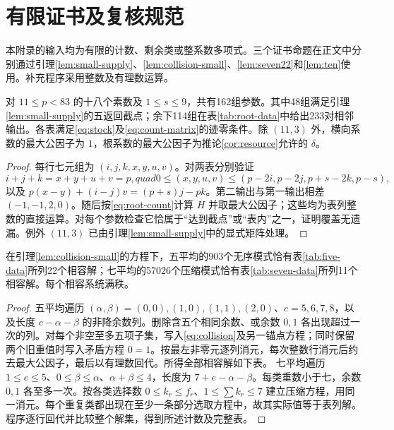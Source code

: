 \section{有限证书及复核规范}\label{app:certificates}
本附录的输入均为有限的计数、剩余类或整系数多项式。三个证书命题在正文中分别通过引理\ref{lem:small-supply}、\ref{lem:collision-small}、\ref{lem:seven22}和\ref{lem:ten}使用。补充程序采用整数及有理数运算。

\begin{proposition}[根计数证书]\label{prop:root-certificate}
对 $11\le p<83$ 的十八个素数及 $1\le s\le9$，共有162组参数。其中48组满足引理\ref{lem:small-supply}的五返回截点；余下114组在表\ref{tab:root-data}中给出233对相邻输出。各表满足\eqref{eq:stock}及\eqref{eq:count-matrix}的迹零条件。除 $(11,3)$ 外，横向系数的最大公因子为 $1$，根系数的最大公因子为推论\ref{cor:resource}允许的 $\delta$。
\end{proposition}
\begin{proof}
每行七元组为 $(i,j,k,x,y,u,v)$。对两表分别验证
\[
i+j+k=x+y+u+v=p,quad
0\le(x,y,u,v)\le(p-2i,p-2j,p+s-2k,p-s),
\]
以及 $p(x-y)+(i-j)v=(p+s)j-pk$。第二输出与第一输出相差 $(-1,-1,2,0)$。随后按\eqref{eq:root-count}计算 $H$ 并取最大公因子；这些均为表列整数的直接运算。对每个参数检查它恰属于“达到截点”或“表内”之一，证明覆盖无遗漏。例外 $(11,3)$ 已由引理\ref{lem:small-supply}中的显式矩阵处理。
\end{proof}


\begin{proposition}[碰撞分类证书]\label{prop:collision-certificate}
在引理\ref{lem:collision-small}的方程下，五平均的903个无序模式恰有表\ref{tab:five-data}所列22个相容解；七平均的57026个压缩模式恰有表\ref{tab:seven-data}所列11个相容解。每个相容系统满秩。
\end{proposition}
\begin{proof}
五平均遍历 $(\alpha,\beta)=(0,0),(1,0),(1,1),(2,0)$、$c=5,6,7,8$，以及长度 $c-\alpha-\beta$ 的非降余数列。删除含五个相同余数、或余数 $0,1$ 各出现超过一次的列。对每个非空至多五项子集，写入\eqref{eq:collision}及另一锚点方程；同时保留两个旧重值时写入矛盾方程 $0=1$。按最左非零元逐列消元，每次整数行消元后约去最大公因子，最后以有理数回代。所得全部相容解如下表。
七平均遍历 $1\le e\le5$、$0\le\beta\le\alpha$、$\alpha+\beta\le4$，长度为 $7+e-\alpha-\beta$。每类重数小于七，余数 $0,1$ 各至多一次。按各类选择数 $0\le k_r\le f_r$、$1\le\sum k_r\le7$ 建立压缩方程，用同一消元。每个重复类都出现在至少一条部分选取方程中，故其实际值等于表列解。程序逐行回代并比较整个解集，得到所述计数及完整表。
\end{proof}

